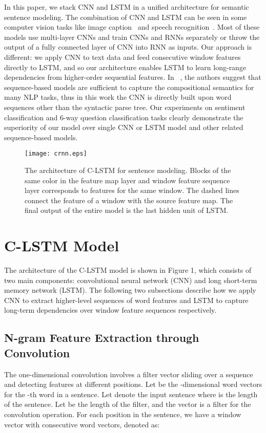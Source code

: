 \documentclass[11pt,letterpaper]{article}
\begin{document}
\indent In this paper, we stack CNN and LSTM in a unified
architecture for semantic sentence modeling. The combination of CNN and
LSTM can be seen in some computer vision tasks like image
caption~\cite{caption} and speech recognition~\cite{saina}. Most of
these models use multi-layer CNNs and train CNNs and RNNs separately or
throw the output of a fully connected layer of CNN into RNN as inputs.
Our approach is different: we apply CNN to text data and feed
consecutive window features directly to LSTM, and so our architecture
enables LSTM to
learn long-range dependencies from higher-order sequential features. In
~\cite{lijiwei}, the authors suggest that sequence-based models are
sufficient to capture the compositional semantics for many NLP tasks,
thus in this work the CNN is directly built upon word sequences other
than the syntactic parse tree. Our experiments on sentiment
classification and 6-way question classification tasks clearly
demonstrate the
superiority of our model over single CNN or LSTM model and other related
sequence-based models.
\begin{figure}[t]
\centering
\texttt{[image: crnn.eps]}
\caption{The architecture of C-LSTM for sentence modeling. Blocks of the
same color in the feature map layer and window feature sequence layer
corresponds to features for the same window. The dashed lines connect
the feature of a window with the source feature map.  The final output
of the entire model is the last hidden unit of LSTM.}
\end{figure}

\section{C-LSTM Model}
The architecture of the C-LSTM model is shown in Figure 1, which
consists of two main components: convolutional neural network (CNN) and long
short-term memory network (LSTM). The following two subsections
describe how we apply CNN to extract higher-level sequences of word
features and LSTM to capture long-term dependencies over window feature
sequences respectively.

\subsection{N-gram Feature Extraction through Convolution}
The one-dimensional convolution involves a filter vector sliding over a
sequence and detecting features at different positions. Let
 be the -dimensional word vectors for
the -th word in a sentence. Let  denote the input sentence where  is the length of the
sentence. Let  be the length of the filter, and the vector
 is a filter for the convolution
operation. For each position  in the sentence, we have a window
vector  with  consecutive word vectors, denoted as:
\end{document}
